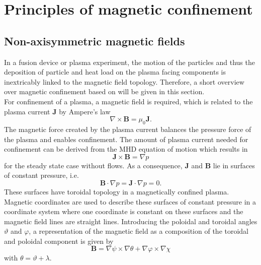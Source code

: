 %
\chapter{Principles of magnetic confinement}
\label{sec:principles}

\section{Non-axisymmetric magnetic fields}
In a fusion device or plasma experiment, the motion of the particles and thus the deposition of particle and heat load on the plasma facing components is inextricably linked to the magnetic field topology. Therefore, a short overview over magnetic confinement based on \cite{Helander2014} will be given in this section.\\
For confinement of a plasma, a magnetic field is required, which is related to the plasma current \textbf{J} by Ampere's law
\begin{equation}
    \nabla \times \textbf{B} = \mu_0\textbf{J}.
\end{equation}
The magnetic force created by the plasma current balances the pressure force of the plasma and enables confinement. The amount of plasma current needed for confinement can be derived from the MHD equation of motion which results in
\begin{equation}
    \textbf{J} \times \textbf{B} = \nabla p \label{eq2}
\end{equation}
for the steady state case without flows. As a consequence, \textbf{J} and \textbf{B} lie in surfaces of constant pressure, i.e.
\begin{equation}
    \textbf{B}\cdot \nabla p =  \textbf{J}\cdot \nabla p = 0.
    \label{eq3}
\end{equation}
These surfaces have toroidal topology in a magnetically confined plasma.
Magnetic coordinates are used to describe these surfaces of constant pressure in a coordinate system where one coordinate is constant on these surfaces and the magnetic field lines are straight lines. Introducing the poloidal and toroidal angles $\vartheta$ and $\varphi$, a representation of the magnetic field as a composition of the toroidal and poloidal component is given by
\begin{equation}
    \textbf{B} = \nabla \psi \times \nabla \theta + \nabla \varphi \times \nabla \chi
\end{equation}
with $ \theta = \vartheta + \lambda$.\\
